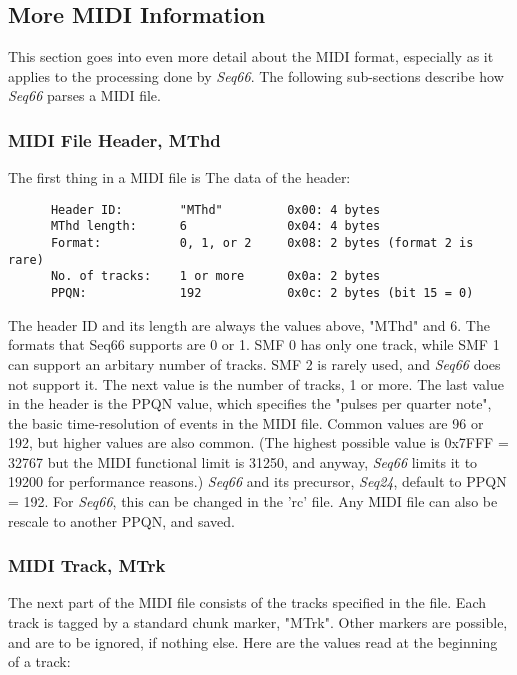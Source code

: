 \subsection{More MIDI Information}
\label{subsec:midi_information_more}

   This section goes into even more detail about the MIDI format, especially as
   it applies to the processing done by \textsl{Seq66}.
   The following sub-sections describe how \textsl{Seq66}
   parses a MIDI file.

\subsubsection{MIDI File Header, MThd}
\label{subsubsec:midi_format_header}

   The first thing in a MIDI file is The data of the header:

   \begin{verbatim}
      Header ID:        "MThd"         0x00: 4 bytes
      MThd length:      6              0x04: 4 bytes
      Format:           0, 1, or 2     0x08: 2 bytes (format 2 is rare)
      No. of tracks:    1 or more      0x0a: 2 bytes
      PPQN:             192            0x0c: 2 bytes (bit 15 = 0)
   \end{verbatim}

   The header ID and its length are always the values above, "MThd" and 6.
   The formats that Seq66 supports are 0 or 1.
   SMF 0 has only one track, while SMF 1 can
   support an arbitary number of tracks.
   SMF 2 is rarely used, and \textsl{Seq66} does not support it.
   The next value is the number of tracks, 1 or more.
   The last value in the header is the
   PPQN value, which specifies the "pulses per quarter note", the
   basic time-resolution of events in the MIDI file.  Common values are 96 or
   192, but higher values are also common.
   (The highest possible value is 0x7FFF = 32767 but the MIDI functional limit
   is 31250, and anyway,
   \textsl{Seq66} limits it to 19200 for performance reasons.)
   \textsl{Seq66} and its precursor, \textsl{Seq24}, default to PPQN = 192.
   For \textsl{Seq66}, this can be changed in the 'rc' file.
   Any MIDI file can also be rescale to another PPQN, and saved.

\subsubsection{MIDI Track, MTrk}
\label{subsubsec:midi_format_track}

   The next part of the MIDI file consists of the tracks specified in the file.
   Each track is tagged by
   a standard chunk marker, "MTrk".  Other markers are possible, and are to be
   ignored, if nothing else.  Here are the values read at the beginning of a
   track:

